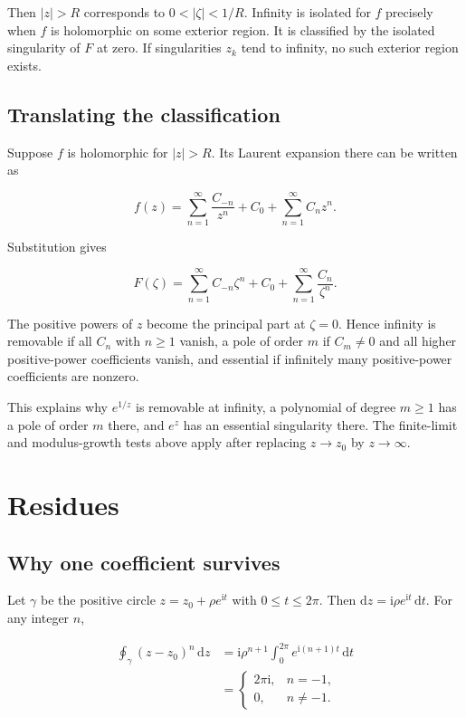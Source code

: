 \documentclass[11pt,a4paper]{article}
\theoremstyle{definition}
\theoremstyle{plain}
\begin{document}
Then $|z|>R$ corresponds to $0<|\zeta|<1/R$. Infinity is isolated for $f$ precisely when $f$ is holomorphic on some exterior region. It is classified by the isolated singularity of $F$ at zero. If singularities $z_k$ tend to infinity, no such exterior region exists.

\subsection{Translating the classification}

Suppose $f$ is holomorphic for $|z|>R$. Its Laurent expansion there can be written as

\[
f(z)=\sum_{n=1}^{\infty}\frac{C_{-n}}{z^n}+C_0+\sum_{n=1}^{\infty}C_nz^n.
\]

Substitution gives

\[
F(\zeta)=\sum_{n=1}^{\infty}C_{-n}\zeta^n+C_0+
\sum_{n=1}^{\infty}\frac{C_n}{\zeta^n}.
\]

The positive powers of $z$ become the principal part at $\zeta=0$. Hence infinity is removable if all $C_n$ with $n\ge1$ vanish, a pole of order $m$ if $C_m\ne0$ and all higher positive-power coefficients vanish, and essential if infinitely many positive-power coefficients are nonzero.

This explains why $e^{1/z}$ is removable at infinity, a polynomial of degree $m\ge1$ has a pole of order $m$ there, and $e^z$ has an essential singularity there. The finite-limit and modulus-growth tests above apply after replacing $z\to z_0$ by $z\to\infty$.

\section{Residues}

\subsection{Why one coefficient survives}

Let $\gamma$ be the positive circle $z=z_0+\rho e^{\mathrm{i}t}$ with $0\le t\le2\pi$. Then $\mathrm{d}z=\mathrm{i}\rho e^{\mathrm{i}t}\,\mathrm{d}t$. For any integer $n$,

\[
\begin{aligned}
\oint_\gamma(z-z_0)^n\,\mathrm{d}z
&=\mathrm{i}\rho^{n+1}\int_0^{2\pi}e^{\mathrm{i}(n+1)t}\,\mathrm{d}t\\
&=\begin{cases}2\pi\mathrm{i},&n=-1,\\0,&n\ne-1.\end{cases}
\end{aligned}
\]
\end{document}
